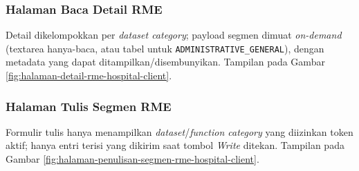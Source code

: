 \subsubsection{Halaman Baca Detail RME}
\label{subsubsec:halaman-baca-detail-rme-hospital-client}

Detail dikelompokkan per \textit{dataset category}; payload segmen dimuat \textit{on-demand} (textarea hanya-baca, atau tabel untuk \texttt{ADMINISTRATIVE\_GENERAL}), dengan metadata yang dapat ditampilkan/disembunyikan. Tampilan pada Gambar \ref{fig:halaman-detail-rme-hospital-client}.

\subsubsection{Halaman Tulis Segmen RME}
\label{subsubsec:halaman-penulisan-segmen-rme-hospital-client}

Formulir tulis hanya menampilkan \textit{dataset}/\textit{function category} yang diizinkan token aktif; hanya entri terisi yang dikirim saat tombol \textit{Write} ditekan. Tampilan pada Gambar \ref{fig:halaman-penulisan-segmen-rme-hospital-client}.
